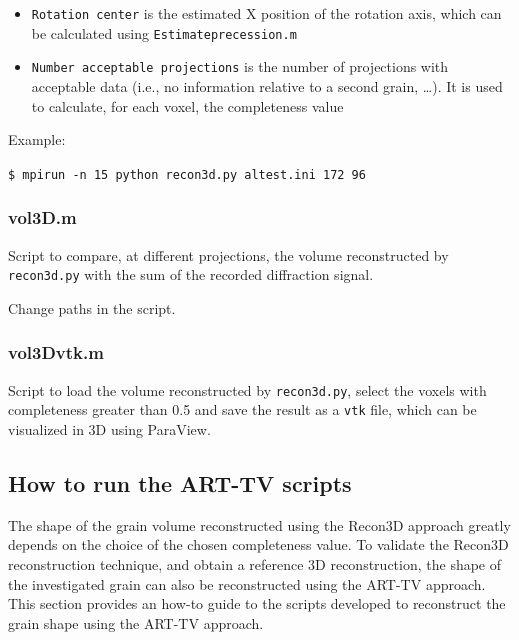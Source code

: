 \documentclass[11pt]{scrartcl}
\begin{document}
\begin{itemize}
    \item {\texttt{Rotation center}} is the estimated {\footnotesize{X}} position of the rotation axis, which can be calculated using {\texttt{Estimate\textunderscore precession.m}}
    \item {\texttt{Number acceptable projections}} is the number of projections with acceptable data (i.e., no information relative to a second grain, \ldots). It is used to calculate, for each voxel, the completeness value 
\end{itemize}

Example:

{\texttt{\$ mpirun -n 15 python recon3d.py al\textunderscore test.ini 172 96}} 
\subsubsection{vol3D.m}

Script to compare, at different projections, the volume reconstructed by {\texttt{recon3d.py}} with the sum of the recorded diffraction signal. 

\danger Change paths in the script. 

\subsubsection{vol3D\textunderscore vtk.m}

Script to load the volume reconstructed by {\texttt{recon3d.py}}, select the voxels with completeness greater than 0.5 and save the result as a {\texttt{vtk}} file, which can be visualized in {\footnotesize{3D}} using ParaView.

\subsection{How to run the ART-TV scripts}

The shape of the grain volume reconstructed using the Recon3D approach greatly depends on the choice of the chosen completeness value. To validate the Recon3D reconstruction technique, and obtain a reference {\footnotesize{3D}} reconstruction, the shape of the investigated grain can also be reconstructed using the {\footnotesize{ART-TV}} approach. This section provides an how-to guide to the scripts developed to reconstruct the grain shape using the {\footnotesize{ART-TV}} approach.
\end{document}
